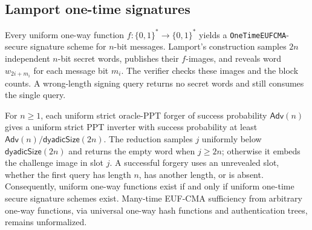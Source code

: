 \begin{result}
\subsection{Lamport one-time signatures}
Every uniform one-way function $f:\{0,1\}^*\to\{0,1\}^*$ yields a \texttt{OneTimeEUFCMA}-secure
signature scheme for $n$-bit messages. Lamport's construction samples $2n$ independent $n$-bit
secret words, publishes their $f$-images, and reveals word $w_{2i+m_i}$ for each message bit $m_i$.
The verifier checks these images and the block counts. A wrong-length signing query returns no
secret words and still consumes the single query.\citep{Lamport1979}

For $n\ge1$, each uniform strict oracle-PPT forger of success probability $\mathsf{Adv}(n)$
gives a uniform strict PPT inverter with success probability at least $\mathsf{Adv}(n)/\mathsf{dyadicSize}(2n)$. The reduction samples
$j$ uniformly below $\mathsf{dyadicSize}(2n)$ and returns the empty word when $j\ge2n$; otherwise it
embeds the challenge image in slot $j$. A successful forgery uses an unrevealed slot, whether the
first query has length $n$, has another length, or is absent. Consequently, uniform one-way
functions exist if and only if uniform one-time secure signature schemes exist. Many-time
EUF-CMA sufficiency from arbitrary one-way functions, via universal one-way hash functions and
authentication trees, remains unformalized.\citep{Rompel1990}
\end{result}
